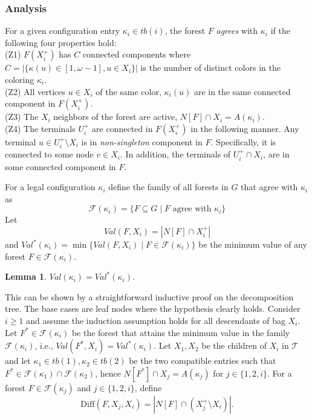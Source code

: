 \documentclass[12pt]{article}
\newtheorem{lemma}[theorem]{Lemma}
\def\Proof{\par\noindent{\bf Proof:~}}
\newcommand{\DIFF}[0]{\mbox{Diff}}
\newcommand{\TD}[0]{\mathcal{T}}
\begin{document}
\subsubsection{Analysis}
For a given configuration entry $\kappa_i\in tb(i)$, the forest $F$ \emph{agrees} with $\kappa_i$ if the following four properties hold:\\
(Z1) $F(X_i^{+})$ has $C$ connected components where $C=|\{ \kappa(u) \in [1, \omega-1], u \in X_i\}|$  is the number of distinct colors in the coloring $\kappa_i$. \\
(Z2) All vertices $u \in X_i$ of the same color, $\kappa_i(u)$ are in the same connected component in $F(X_i^{+})$.\\
(Z3) The $X_i$ neighbors of the forest are active, $N[F]\cap X_i= A(\kappa_i)$.\\
(Z4) The terminals $U_i^{+}$ are connected in $F(X_i^{+})$ in the following manner.
Any terminal $u \in U_i^{+} \setminus X_i$ is in \emph{non-singleton} component in $F$. Specifically, it is connected to some node $v \in X_i$. In addition, the terminals of $U_i^{+} \cap X_i$, are in some connected component in $F$.
\par For a legal configuration $\kappa_i$ define the family of all forests in $G$ that agree with $\kappa_i$ as
\begin{equation}
\label{eq:forest_cost}
\mathcal{F}(\kappa_i)=\{ F \subseteq G \mid F \text{~agree with~} \kappa_i \}
\end{equation}
Let
\begin{equation}
\label{eq:val_forest}
Val(F, X_i)=|N[F] \cap X_i^{+}|
\end{equation}
and $Val^{*}(\kappa_i)=\min\{Val(F, X_i) \mid F \in \mathcal{F}(\kappa_i)\}$ be the minimum value of any forest $F \in \mathcal{F}(\kappa_i)$.
\begin{lemma}
\label{lem:cor}
$Val(\kappa_i)=Val^{*}(\kappa_i)$.
\end{lemma}
\Proof
This can be shown by a straightforward inductive proof on the decomposition tree. The base cases are leaf nodes where the hypothesis clearly holds. Consider $i\geq 1$ and assume the induction assumption holds for all descendants of bag $X_i$.
Let $F^{*}\in \mathcal{F}(\kappa_i)$ be the forest that attains the minimum value in the family $\mathcal{F}(\kappa_i)$, i.e., $Val(F^{*}, X_i) =Val^{*}(\kappa_i)$.
Let $X_{1}, X_{2}$ be the children of $X_i$ in $\TD$ and let $\kappa_{1} \in tb(1), \kappa_{2} \in tb(2)$ be the two compatible entries such that $F^{*} \in \mathcal{F}(\kappa_1) \cap \mathcal{F}(\kappa_2)$, hence $N[F^{*}] \cap X_j=A(\kappa_j)$ for $j \in \{1,2,i\}$.
For a forest $F \in \mathcal{F}(\kappa_j)$ and $j \in \{1,2,i\}$, define
\begin{equation}
\label{eq:delta_def}
\DIFF(F,X_j,X_i)=|N[F] \cap (X_j^{+} \setminus X_i)|.
\end{equation}
\end{document}
